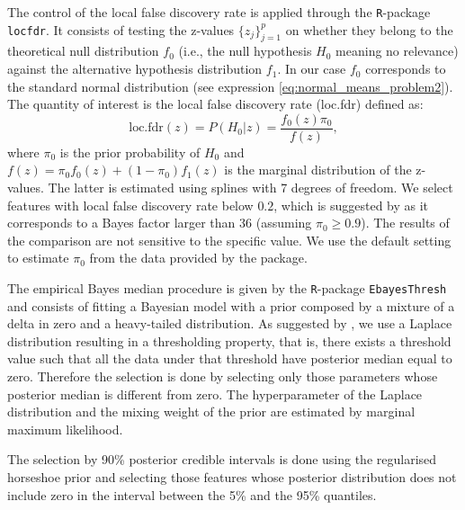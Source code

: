\documentclass[american,]{article}
\theoremstyle{definition}
\begin{document}
The control of the local false discovery rate is applied through the
\texttt{R}-package \texttt{locfdr}. It consists of testing the
z-values $\{z_{j}\}_{j=1}^{p}$ on whether they belong to the
theoretical null distribution $f_{0}$ (i.e., the null hypothesis $H_0$
meaning no relevance) against the alternative hypothesis distribution
$f_{1}$. In our case $f_{0}$ corresponds to the standard normal
distribution (see expression \eqref{eq:normal_means_problem2}). The
quantity of interest is the local false discovery rate (loc.fdr)
defined as: \
\begin{equation}
\text{loc.fdr}(z)=P(H_{0}|z)=\frac{f_{0}(z)\pi_{0}}{f(z)},
\end{equation}
where $\pi_{0}$ is the prior probability of $H_0$ and
$f(z)=\pi_{0}f_{0}(z)+(1-\pi_{0})f_{1}(z)$ is the marginal
distribution of the z-values. The latter is estimated using splines
with 7 degrees of freedom. We select features with local false
discovery rate below $0.2$, which is suggested by
\citet{efron2012large} as it corresponds to a Bayes factor larger than
36 (assuming $\pi_{0}\geq0.9$). The results of the comparison are not
sensitive to the specific value. We use the default setting to
estimate $\pi_{0}$ from the data provided by the package.

The empirical Bayes median procedure is given by the
\texttt{R}-package \texttt{EbayesThresh} and consists of fitting a
Bayesian model with a prior composed by a mixture of a delta in zero
and a heavy-tailed distribution. As suggested by
\cite{johnstone2004needles}, we use a Laplace distribution resulting
in a thresholding property, that is, there exists a threshold value
such that all the data under that threshold have posterior median
equal to zero. Therefore the selection is done by selecting only those
parameters whose posterior median is different from zero. The
hyperparameter of the Laplace distribution and the mixing weight of
the prior are estimated by marginal maximum likelihood.  

The selection
by 90\% posterior credible intervals is done using the regularised
horseshoe prior and selecting those features whose posterior
distribution does not include zero in the interval between the 5\% and
the 95\% quantiles.
\end{document}
